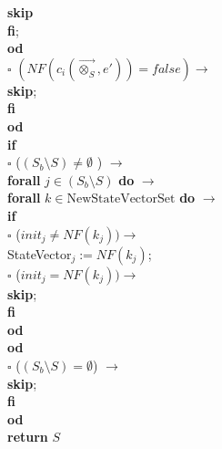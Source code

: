 \documentclass[a4paper,10pt]{article}
\theoremstyle{plain}
\theoremstyle{definition}
\newcommand{\ovr}{\overrightarrow}
\newcommand{\tb}{\textbf}
\newcommand{\ra}{$\rightarrow$}
\newcommand{\sq}{$\square$}
\begin{document}
\begin{tabbing}
  \>	\>	\> 	\>    	\>        \> \>  \tb{skip}\\	
  \>	\>	\> 	\> 	\>          \tb{fi}; \\
  \>	\>	\>	\> \tb{od}\\
  \>	\>	\sq 	\>  $(NF(c_i(\ovr{\otimes_S},e')) = false) \rightarrow$ \\
  \>	\>	\> 	\>\tb{skip};\\
  \>	\>	\tb{fi}\\
  \>	\tb{od} \\
  \>	\tb{if}  \\
  \>	\sq	\> ($( S_{b} \setminus S) \neq \emptyset $ ) \ra \\ 
  \>	\>	\> 	\tb{forall}  $j \in ( S_b \setminus S) $ \tb{do} $\rightarrow$\\
  \>	\>	\>  	\> 	\tb{forall} $k \in \text{NewStateVectorSet}$ \tb{do} $\rightarrow$ \\
  \>	\>	\> 	\> 	\>   	\tb{if} \\
  \>	\>	\>  	\> 	\> 	\sq 	\>	($init_j \neq NF(k_j)) \rightarrow$ \\
  \>	\>	\>	\>	\>	\>	\>	\>	StateVector$_j := NF(k_j)$; \\
  \> 	\>	\>	\>	\>	\sq	\>	($init_j = NF(k_j)) \rightarrow$ \\
  \>	\>	\>	\>	\>	\>	\>	\>	\tb{skip};\\
  \>	\>	\>	\>	\>	\tb{fi}\\
  \> 	\>	\>	\>	\tb{od}\\
  \>	\>	\>	\tb{od}\\
  \>	\sq	\>  	($ (S_b \setminus S) = \emptyset $) \ra  \\
  \>	\> 	\>  	\>	\tb{skip};\\
  \>	\tb{fi} \\
  \tb{od}\\
  \tb{return} $S$
\end{tabbing} 

\newpage
\end{document}
